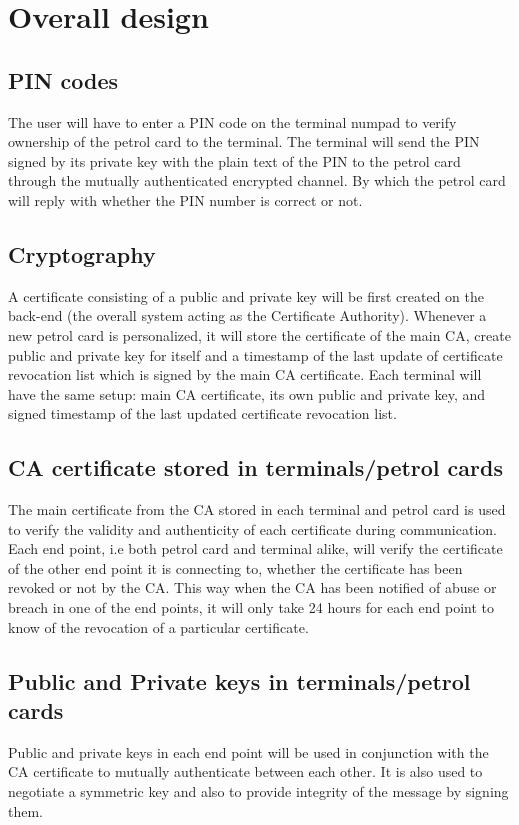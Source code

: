 \section{Overall design}
\subsection{PIN codes}
The user will have to enter a PIN code on the terminal numpad to verify ownership of the petrol card to the terminal. The terminal will send the PIN signed by its private key with the plain text of the PIN to the petrol card through the mutually authenticated encrypted channel. By which the petrol card will reply with whether the PIN number is correct or not.

\subsection{Cryptography}
A certificate consisting of a public and private key will be first created on the back-end (the overall system acting as the Certificate Authority). Whenever a new petrol card is personalized, it will store the certificate of the main CA, create public and private key for itself and a timestamp of the last update of certificate revocation list which is signed by the main CA certificate. Each terminal will have the same setup: main CA certificate, its own public and private key, and signed timestamp of the last updated certificate revocation list.

\subsection{CA certificate stored in terminals/petrol cards}
The main certificate from the CA stored in each terminal and petrol card is used to verify the validity and authenticity of each certificate during communication. Each end point, i.e both petrol card and terminal alike, will verify the certificate of the other end point it is connecting to, whether the certificate has been revoked or not by the CA. This way when the CA has been notified of abuse or breach in one of the end points, it will only take 24 hours for each end point to know of the revocation of a particular certificate.

\subsection{Public and Private keys in terminals/petrol cards}
Public and private keys in each end point will be used in conjunction with the CA certificate to mutually authenticate between each other. It is also used to negotiate a symmetric key and also to provide integrity of the message by signing them.

